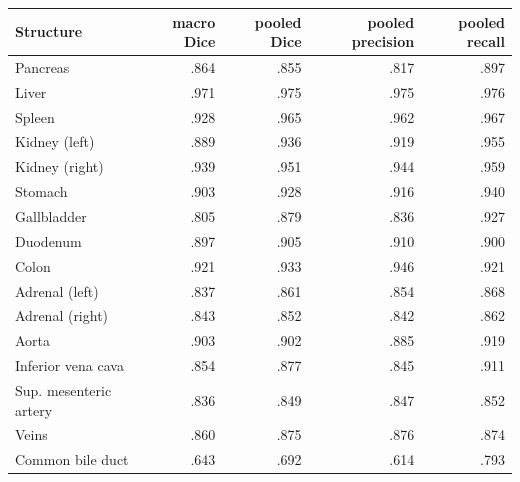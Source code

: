 \begin{tabular}{lrrrr}
\toprule
Structure & macro Dice & pooled Dice & pooled precision & pooled recall \\
\midrule
Pancreas & .864 & .855 & .817 & .897 \\
Liver & .971 & .975 & .975 & .976 \\
Spleen & .928 & .965 & .962 & .967 \\
Kidney (left) & .889 & .936 & .919 & .955 \\
Kidney (right) & .939 & .951 & .944 & .959 \\
Stomach & .903 & .928 & .916 & .940 \\
Gallbladder & .805 & .879 & .836 & .927 \\
Duodenum & .897 & .905 & .910 & .900 \\
Colon & .921 & .933 & .946 & .921 \\
Adrenal (left) & .837 & .861 & .854 & .868 \\
Adrenal (right) & .843 & .852 & .842 & .862 \\
Aorta & .903 & .902 & .885 & .919 \\
Inferior vena cava & .854 & .877 & .845 & .911 \\
Sup. mesenteric artery & .836 & .849 & .847 & .852 \\
Veins & .860 & .875 & .876 & .874 \\
Common bile duct & .643 & .692 & .614 & .793 \\
\bottomrule
\end{tabular}
